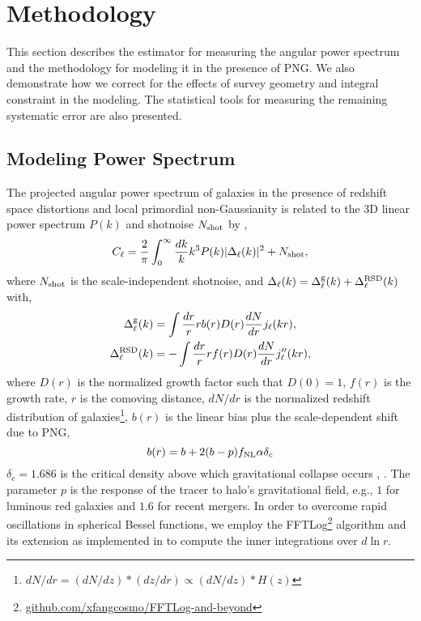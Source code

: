 \section{Methodology}
\label{sec:method}
This section describes the estimator for measuring the angular power spectrum and the methodology for modeling it in the presence of PNG. We also demonstrate how we correct for the effects of survey geometry and integral constraint in the modeling. The statistical tools for measuring the remaining systematic error are also presented. 
 
 
 \subsection{Modeling Power Spectrum}
The projected angular power spectrum of galaxies in the presence of redshift space distortions and local primordial non-Gaussianity is related to the 3D linear power spectrum $P(k)$ and shotnoise $N_{\rm shot}$ by \citep[see, e.g.,][]{slosar2008constraints},
\begin{equation}\label{eq:cell}
    C_{\ell} = \frac{2}{\pi}\int_{0}^{\infty}\frac{dk}{k}k^{3}P(k)|\Delta_{\ell}(k)|^{2} + N_{\rm shot},
\end{equation}
where $N_{\rm shot}$ is the scale-independent shotnoise, and $\Delta_{\ell}(k) = \Delta^{\rm g}_{\ell}(k) + \Delta^{\rm RSD}_{\ell}(k)$ with,
\begin{align}
    \Delta^{\rm g}_{\ell}(k) &= \int \frac{dr}{r} r b(r) D(r) \frac{dN}{dr} j_{\ell}(kr),\\
    \Delta^{\rm RSD}_{\ell}(k) &= - \int \frac{dr}{r} r f(r) D(r) \frac{dN}{dr} j^{\prime\prime}_{\ell}(kr),
\end{align}
where $D(r)$ is the normalized growth factor such that $D(0)=1$, $f(r)$ is the growth rate, $r$ is the comoving distance, $dN/dr$ is the normalized redshift distribution of galaxies\footnote{$dN/dr = (dN/dz)*(dz/dr) \propto (dN/dz)*H(z)$}, $b(r)$ is the linear bias plus the scale-dependent shift due to PNG,
\begin{equation}
b(r) = b + 2 (b - p) f_{\rm NL} \alpha \delta_{c} 
\end{equation}
$\delta_{c}=1.686$ is the critical density above which gravitational collapse occurs , . The parameter $p$ is the response of the tracer to halo's gravitational field, e.g., $1$ for luminous red galaxies and $1.6$ for recent mergers. In order to overcome rapid oscillations in spherical Bessel functions, we employ the FFTLog\footnote{\href{https://github.com/xfangcosmo/FFTLog-and-beyond}{github.com/xfangcosmo/FFTLog-and-beyond}} algorithm and its extension as implemented in  to compute the inner integrations over $d\ln r$.

